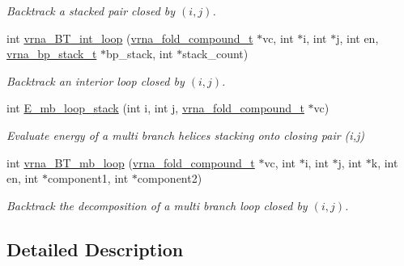 \begin{DoxyCompactItemize}
\begin{DoxyCompactList}\small\item\em Backtrack a stacked pair closed by $ (i,j) $. \end{DoxyCompactList}\item 
\hypertarget{group__loops_ga849b7dc373b6c0b029672e16a7e52053}{int \hyperlink{group__loops_ga849b7dc373b6c0b029672e16a7e52053}{vrna\-\_\-\-B\-T\-\_\-int\-\_\-loop} (\hyperlink{group__fold__compound_ga1b0cef17fd40466cef5968eaeeff6166}{vrna\-\_\-fold\-\_\-compound\-\_\-t} $\ast$vc, int $\ast$i, int $\ast$j, int en, \hyperlink{group__data__structures_gaa651bda42e7692f08cb603cd6834b0ee}{vrna\-\_\-bp\-\_\-stack\-\_\-t} $\ast$bp\-\_\-stack, int $\ast$stack\-\_\-count)}\label{group__loops_ga849b7dc373b6c0b029672e16a7e52053}

\begin{DoxyCompactList}\small\item\em Backtrack an interior loop closed by $ (i,j) $. \end{DoxyCompactList}\item 
int \hyperlink{group__loops_ga81d73d23f480f84df8cfd0042c032503}{E\-\_\-mb\-\_\-loop\-\_\-stack} (int i, int j, \hyperlink{group__fold__compound_ga1b0cef17fd40466cef5968eaeeff6166}{vrna\-\_\-fold\-\_\-compound\-\_\-t} $\ast$vc)
\begin{DoxyCompactList}\small\item\em Evaluate energy of a multi branch helices stacking onto closing pair (i,j) \end{DoxyCompactList}\item 
int \hyperlink{group__loops_ga9cb520ddfd8b3a48089a7910b045d06b}{vrna\-\_\-\-B\-T\-\_\-mb\-\_\-loop} (\hyperlink{group__fold__compound_ga1b0cef17fd40466cef5968eaeeff6166}{vrna\-\_\-fold\-\_\-compound\-\_\-t} $\ast$vc, int $\ast$i, int $\ast$j, int $\ast$k, int en, int $\ast$component1, int $\ast$component2)
\begin{DoxyCompactList}\small\item\em Backtrack the decomposition of a multi branch loop closed by $ (i,j) $. \end{DoxyCompactList}\end{DoxyCompactItemize}


\subsection{Detailed Description}


